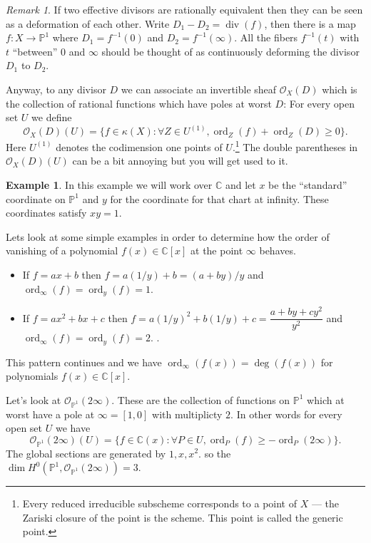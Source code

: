 \documentclass[12pt]{article}
\numberwithin{equation}{section}
\theoremstyle{definition}
\newtheorem{example}[theorem]{Example}
\theoremstyle{remark}
\newtheorem{remark}[theorem]{Remark}
\newcommand{\CC}{\mathbb{C}}
\newcommand{\Ocal}{\mathcal{O}}
\newcommand{\PP}{\mathbb{P}}
\newcommand{\ord}{\operatorname{ord}}
\renewcommand{\div}{\operatorname{div}}
\begin{document}
\begin{remark}
	If two effective divisors are rationally equivalent then they can be seen as a deformation of each other. 
	Write $D_1 - D_2 = \div(f)$, then there is a map $f:X \to \PP^1$ where $D_1 = f^{-1}(0)$ and $D_2 = f^{-1}(\infty)$. 
	All the fibers $f^{-1}(t)$ with $t$ ``between'' $0$ and $\infty$ should be thought of as continuously deforming the divisor $D_1$ to $D_2$.
\end{remark}

Anyway, to any divisor $D$ we can associate an invertible sheaf $\Ocal_X(D)$ which is the collection of rational functions which have poles at worst $D$:
For every open set $U$ we define 
$$ \Ocal_X(D)(U) = \lbrace f \in \kappa(X) \colon \forall Z \in U^{(1)}, \ord_Z(f)+\ord_Z(D) \geq 0 \rbrace. $$
Here $U^{(1)}$ denotes the codimension one points of $U$.\footnote{Every reduced irreducible subscheme corresponds to a point of $X$ --- the Zariski closure of the point is the scheme. This point is called the generic point.}
The double parentheses in $\Ocal_X(D)(U)$ can be a bit annoying but you will get used to it.


\begin{example}
	In this example we will work over $\CC$ and let $x$ be the ``standard'' coordinate on $\PP^1$ and $y$ for the coordinate for that chart at infinity. 
	These coordinates satisfy $xy=1$.
	
	Lets look at some simple examples in order to determine how the order of vanishing of a polynomial $f(x) \in \CC[x]$ at the point $\infty$ behaves. 
	\begin{itemize}
		\item If $f=ax+b$ then $f = a(1/y)+b = (a+by)/y$ and $\ord_{\infty}(f)=\ord_y(f)=1$.
		\item If $f=ax^2+bx+c$ then $f=a(1/y)^2+b(1/y)+c = \dfrac{a+by+cy^2}{y^2}$ and $\ord_{\infty}(f) = \ord_y(f) = 2$. .
	\end{itemize}
 This pattern continues and we have $\ord_{\infty}(f(x)) = \deg(f(x))$ for polynomials $f(x) \in \CC[x].$
	
	
	Let's look at $\Ocal_{\PP^1}(2\infty)$. 
	These are the collection of functions on $\PP^1$ which at worst have a pole at $\infty = [1,0]$ with multiplicty $2$.
	In other words for every open set $U$ we have 
	$$ \Ocal_{\PP^1}(2\infty)(U) = \lbrace f \in \CC(x) \colon \forall P \in U, \ord_P(f) \geq -\ord_P(2\infty) \rbrace.$$
	The global sections are generated by $1, x, x^2.$
	so the $\dim H^0(\PP^1,\Ocal_{\PP^1}(2\infty))=3$.
\end{example}
\end{document}
